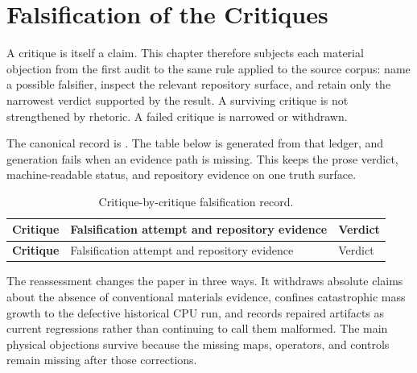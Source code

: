 \chapter{Falsification of the Critiques}
\label{ch:critique-reassessment}

A critique is itself a claim. This chapter therefore subjects each material
objection from the first audit to the same rule applied to the source corpus:
name a possible falsifier, inspect the relevant repository surface, and retain
only the narrowest verdict supported by the result. A surviving critique is
not strengthened by rhetoric. A failed critique is narrowed or withdrawn.

The canonical record is
. The table below is generated
from that ledger, and generation fails when an evidence path is missing. This
keeps the prose verdict, machine-readable status, and repository evidence on
one truth surface.

\small
\begin{longtable}{>{\raggedright\arraybackslash\bfseries}p{}
                  >{\raggedright\arraybackslash}p{}
                  >{\raggedright\arraybackslash}p{}}
  \caption{Critique-by-critique falsification record.}
  \label{tab:critique-reassessment}\\
  \toprule
  Critique & Falsification attempt and repository evidence & Verdict \\
  \midrule
  \endfirsthead
  \toprule
  Critique & Falsification attempt and repository evidence & Verdict \\
  \midrule
  \endhead

\end{longtable}
\normalsize

The reassessment changes the paper in three ways. It withdraws absolute claims
about the absence of conventional materials evidence, confines catastrophic
mass growth to the defective historical CPU run, and records repaired artifacts
as current regressions rather than continuing to call them malformed. The main
physical objections survive because the missing maps, operators, and controls
remain missing after those corrections.
